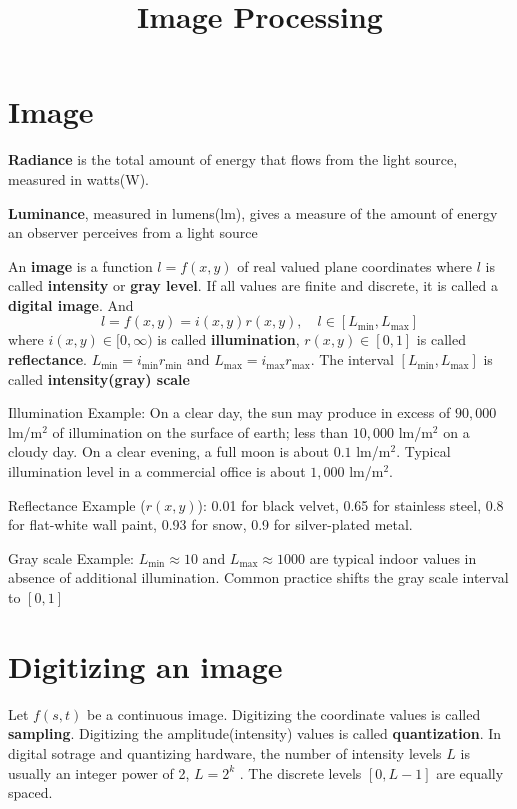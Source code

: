 \documentclass[UTF8]{ctexart}
\title{Image Processing}
\begin{document}
	\maketitle
	
\section{Image}
\begin{definition}
	\textbf{Radiance} is the total amount of energy that flows from the light source, measured in watts(W). 
\end{definition}

\begin{definition}
	\textbf{Luminance}, measured in lumens(lm), gives a measure of the amount of energy an observer perceives from a light source
\end{definition}
	
\begin{definition}
	An  \textbf{image} is a function  $l = f(x, y)$ of real valued plane coordinates where $l$ is called \textbf{intensity} or \textbf{gray level}. If all values are finite and discrete, it is called a \textbf{digital image}. And 
	$$ l =  f(x, y) = i(x, y) r(x, y), \quad l \in [L_{\min}, L_{\max}]$$
	where $i(x, y) \in [0, \infty)$ is called \textbf{illumination}, $r(x, y)\in [0, 1]$ is called \textbf{reflectance}.  $L_{\min} = i_{\min}r_{\min}$ and $L_{\max} = i_{\max}r_{\max}$. The interval $[L_{\min}, L_{\max}]$ is called \textbf{intensity(gray) scale}
\end{definition}

Illumination Example: On a clear day, the sun may produce in excess of $90,000$ lm/m$^2$ of illumination on the surface of earth; less than $10,000$ lm/m$^2$ on a cloudy day. On a clear evening, a full moon is about $0.1$ lm/m$^2$. Typical illumination level in a commercial office is about $1,000$ lm/m$^2$.

Reflectance Example ($r(x, y)$): 0.01 for black velvet, 0.65 for stainless steel, 0.8 for flat-white wall paint, 0.93 for snow, 0.9 for silver-plated metal.

Gray scale Example: $L_{\min} \approx 10$ and $L_{\max} \approx 1000$ are typical indoor values in absence of additional illumination. Common practice shifts the gray scale interval to $[0, 1]$

\section{Digitizing an image}
\begin{definition}
	Let $f(s, t)$ be a continuous image. Digitizing the coordinate values is called \textbf{sampling}. Digitizing the amplitude(intensity) values is called \textbf{quantization}. In digital sotrage and quantizing hardware, the number of intensity levels $L$ is usually an integer power of 2, $L=2^k$ . The discrete levels $[0, L-1]$ are equally spaced.
\end{definition}
\end{document}
